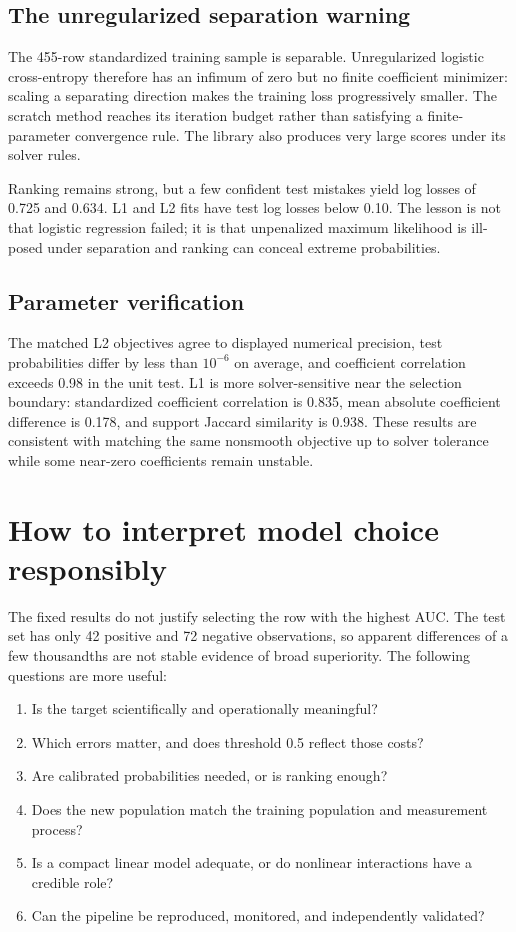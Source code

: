 \documentclass[11pt]{article}
\begin{document}
\subsection{The unregularized separation warning}

The 455-row standardized training sample is separable. Unregularized logistic
cross-entropy therefore has an infimum of zero but no finite coefficient
minimizer: scaling a separating direction makes the training loss progressively
smaller. The scratch method reaches its iteration budget rather than satisfying
a finite-parameter convergence rule. The library also produces very large
scores under its solver rules.

Ranking remains strong, but a few confident test mistakes yield log losses of
0.725 and 0.634. L1 and L2 fits have test log losses below 0.10. The lesson is
not that logistic regression failed; it is that unpenalized maximum likelihood
is ill-posed under separation and ranking can conceal extreme probabilities.

\subsection{Parameter verification}

The matched L2 objectives agree to displayed numerical precision, test
probabilities differ by less than $10^{-6}$ on average, and coefficient
correlation exceeds 0.98 in the unit test. L1 is more solver-sensitive near the
selection boundary: standardized coefficient correlation is 0.835, mean
absolute coefficient difference is 0.178, and support Jaccard similarity is
0.938. These results are consistent with matching the same nonsmooth objective
up to solver tolerance while some near-zero coefficients remain unstable.

\section{How to interpret model choice responsibly}

The fixed results do not justify selecting the row with the highest AUC. The
test set has only 42 positive and 72 negative observations, so apparent
differences of a few thousandths are not stable evidence of broad superiority.
The following questions are more useful:

\begin{enumerate}
\item Is the target scientifically and operationally meaningful?
\item Which errors matter, and does threshold 0.5 reflect those costs?
\item Are calibrated probabilities needed, or is ranking enough?
\item Does the new population match the training population and measurement
process?
\item Is a compact linear model adequate, or do nonlinear interactions have a
credible role?
\item Can the pipeline be reproduced, monitored, and independently validated?
\end{enumerate}
\end{document}

